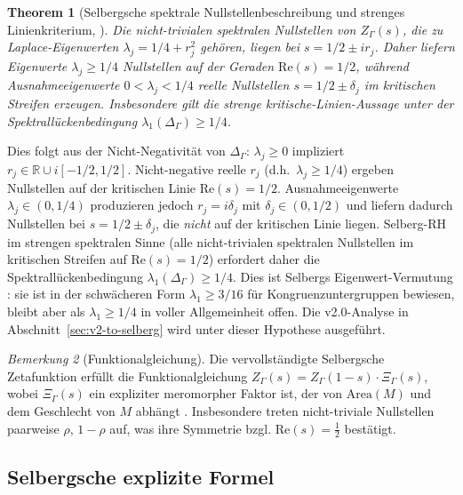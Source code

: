 \documentclass[12pt,a4paper]{article}
\newtheorem{theorem}{Theorem}[section]
\theoremstyle{definition}
\theoremstyle{remark}
\newtheorem{remark}[theorem]{Bemerkung}
\newcommand{\RR}{\mathbb{R}}
\newcommand{\Sel}{Z_{\Gamma}}
\newcommand{\Delop}{\Delta_{\Gamma}}
\begin{document}
\begin{theorem}[Selbergsche spektrale Nullstellenbeschreibung und strenges Linienkriterium, \cite{Selberg1956}]
\label{thm:Sel-RH}
Die nicht-trivialen spektralen Nullstellen von $\Sel(s)$, die zu
Laplace-Eigenwerten $\lambda_j=1/4+r_j^2$ gehören, liegen bei
$s=1/2\pm ir_j$. Daher liefern Eigenwerte $\lambda_j\ge 1/4$ Nullstellen auf
der Geraden $\mathrm{Re}(s)=1/2$, während Ausnahmeeigenwerte
$0<\lambda_j<1/4$ reelle Nullstellen $s=1/2\pm\delta_j$ im kritischen Streifen
erzeugen. Insbesondere gilt die strenge kritische-Linien-Aussage unter der
Spektrallückenbedingung $\lambda_1(\Delop)\ge 1/4$.
\end{theorem}

Dies folgt aus der Nicht-Negativität von $\Delop$: $\lambda_j \ge 0$ impliziert
$r_j \in \RR \cup i[-1/2, 1/2]$.  Nicht-negative reelle $r_j$ (d.h.\ $\lambda_j \ge
1/4$) ergeben Nullstellen auf der kritischen Linie $\mathrm{Re}(s)=1/2$.  Ausnahmeeigenwerte
$\lambda_j \in (0,1/4)$ produzieren jedoch $r_j = i\delta_j$ mit
$\delta_j \in (0,1/2)$ und liefern dadurch Nullstellen bei $s = 1/2 \pm \delta_j$,
die \emph{nicht} auf der kritischen Linie liegen.  Selberg-RH im strengen
spektralen Sinne (alle nicht-trivialen spektralen Nullstellen im kritischen
Streifen auf $\mathrm{Re}(s)=1/2$) erfordert daher die
Spektrallückenbedingung $\lambda_1(\Delop) \ge 1/4$.  Dies ist Selbergs
Eigenwert-Vermutung \cite{Selberg1965}: sie ist in der schwächeren Form
$\lambda_1 \ge 3/16$ für Kongruenzuntergruppen bewiesen, bleibt aber als
$\lambda_1 \ge 1/4$ in voller Allgemeinheit offen.  Die v2.0-Analyse in
Abschnitt~\ref{sec:v2-to-selberg} wird unter dieser Hypothese ausgeführt.

\begin{remark}[Funktionalgleichung]
\label{rem:func-eq}
Die vervollständigte Selbergsche Zetafunktion erfüllt die Funktionalgleichung
$\Sel(s) = \Sel(1-s) \cdot \Xi_\Gamma(s)$, wobei $\Xi_\Gamma(s)$ ein
expliziter meromorpher Faktor ist, der von $\mathrm{Area}(M)$ und dem Geschlecht von
$M$ abhängt \cite{Hejhal1976}.  Insbesondere treten nicht-triviale Nullstellen paarweise
$\rho$, $1-\rho$ auf, was ihre Symmetrie bzgl. $\mathrm{Re}(s)=\tfrac{1}{2}$ bestätigt.
\end{remark}

\subsection{Selbergsche explizite Formel}
\end{document}

